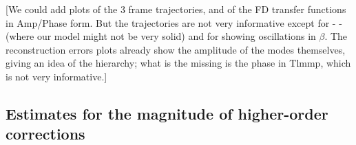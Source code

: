 \documentclass[aps,showpacs,twocolumn,
prd,superscriptaddress,nofootinbib]{revtex4-1}
\newcommand\calT{{\mathcal{T}}}
\newcommand{\SM}[1]{{\color{Red} #1}}
\begin{document}

\SM{[We could add plots of the 3 frame trajectories, and of the FD transfer functions in Amp/Phase form. But the trajectories are not very informative except for - - (where our model might not be very solid) and for showing oscillations in $\beta$. The reconstruction errors plots already show the amplitude of the modes themselves, giving an idea of the hierarchy; what is the missing is the phase in Tlmmp, which is not very informative.]}



\subsection{Estimates for the magnitude of higher-order corrections}
\label{subsec:sizecorrPrec}
\end{document}
